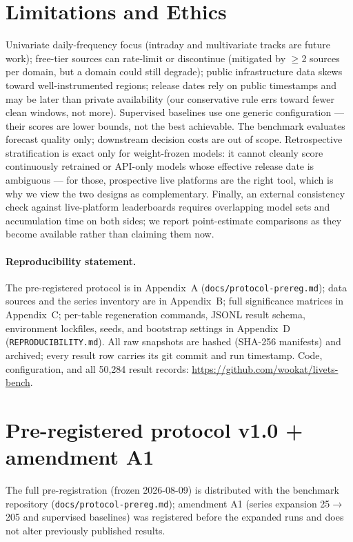 \documentclass{article}
\begin{document}
\section{Limitations and Ethics}

Univariate daily-frequency focus (intraday and multivariate tracks are future work); free-tier sources can rate-limit or discontinue (mitigated by $\geq$2 sources per domain, but a domain could still degrade); public infrastructure data skews toward well-instrumented regions; release dates rely on public timestamps and may be later than private availability (our conservative rule errs toward fewer clean windows, not more). Supervised baselines use one generic configuration --- their scores are lower bounds, not the best achievable. The benchmark evaluates forecast quality only; downstream decision costs are out of scope. Retrospective stratification is exact only for weight-frozen models: it cannot cleanly score continuously retrained or API-only models whose effective release date is ambiguous --- for those, prospective live platforms \citep{garza2026impermanent,meyer2026tsarena} are the right tool, which is why we view the two designs as complementary. Finally, an external consistency check against live-platform leaderboards requires overlapping model sets and accumulation time on both sides; we report point-estimate comparisons as they become available rather than claiming them now.

\paragraph{Reproducibility statement.} The pre-registered protocol is in Appendix~A (\texttt{docs/protocol-prereg.md}); data sources and the series inventory are in Appendix~B; full significance matrices in Appendix~C; per-table regeneration commands, JSONL result schema, environment lockfiles, seeds, and bootstrap settings in Appendix~D (\texttt{REPRODUCIBILITY.md}). All raw snapshots are hashed (SHA-256 manifests) and archived; every result row carries its git commit and run timestamp. Code, configuration, and all 50{,}284 result records: \url{https://github.com/wookat/livets-bench}.




\appendix

\section{Pre-registered protocol v1.0 + amendment A1}
The full pre-registration (frozen 2026-08-09) is distributed with the benchmark repository (\texttt{docs/protocol-prereg.md}); amendment A1 (series expansion 25$\to$205 and supervised baselines) was registered before the expanded runs and does not alter previously published results.
\end{document}
